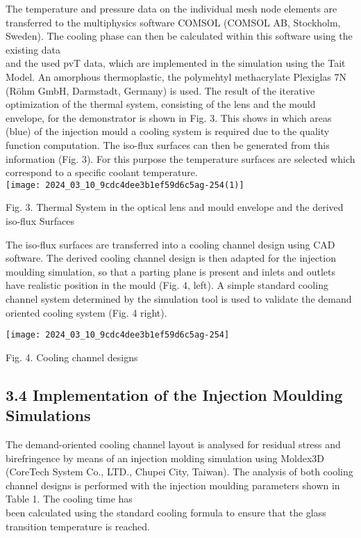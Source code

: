 \documentclass[10pt]{article}
\begin{document}
The temperature and pressure data on the individual mesh node elements are transferred to the multiphysics software COMSOL (COMSOL AB, Stockholm, Sweden). The cooling phase can then be calculated within this software using the existing data\\
and the used pvT data, which are implemented in the simulation using the Tait Model. An amorphous thermoplastic, the polymehtyl methacrylate Plexiglas 7N (Röhm GmbH, Darmstadt, Germany) is used. The result of the iterative optimization of the thermal system, consisting of the lens and the mould envelope, for the demonstrator is shown in Fig. 3. This shows in which areas (blue) of the injection mould a cooling system is required due to the quality function computation. The iso-flux surfaces can then be generated from this information (Fig. 3). For this purpose the temperature surfaces are selected which correspond to a specific coolant temperature.\\
\texttt{[image: 2024\_03\_10\_9cdc4dee3b1ef59d6c5ag-254(1)]}

Fig. 3. Thermal System in the optical lens and mould envelope and the derived iso-flux Surfaces

The iso-flux surfaces are transferred into a cooling channel design using CAD software. The derived cooling channel design is then adapted for the injection moulding simulation, so that a parting plane is present and inlets and outlets have realistic position in the mould (Fig. 4, left). A simple standard cooling channel system determined by the simulation tool is used to validate the demand oriented cooling system (Fig. 4 right).

\begin{center}
\texttt{[image: 2024\_03\_10\_9cdc4dee3b1ef59d6c5ag-254]}
\end{center}

Fig. 4. Cooling channel designs

\subsection*{3.4 Implementation of the Injection Moulding Simulations}
The demand-oriented cooling channel layout is analysed for residual stress and birefringence by means of an injection molding simulation using Moldex3D (CoreTech System Co., LTD., Chupei City, Taiwan). The analysis of both cooling channel designs is performed with the injection moulding parameters shown in Table 1. The cooling time has\\
been calculated using the standard cooling formula to ensure that the glass transition temperature is reached.
\end{document}
